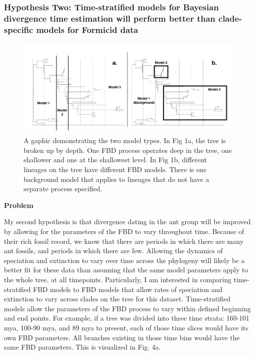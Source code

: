 \documentclass[12pt]{article}
\begin{document}
\subsubsection*{Hypothesis Two: Time-stratified models for Bayesian divergence time estimation will perform better than clade-specific models for Formicid data}
\begin{figure}
  \caption{A gaphic demonstrating the two model types. In Fig 1a, the tree is broken up by depth. One FBD process operates deep in the tree, one shallower and one at the shallowest level. In Fig 1b, different lineages on the tree have different FBD models. There is one background model that applies to lineages that do not have a separate process specified.}
  \centering
    \includegraphics[width=1\textwidth]{2ab}
\end{figure}
\textbf{Problem} \par
My second hypothesis is that divergence dating in the ant group will be improved by allowing for the parameters of the FBD to vary throughout time.
Because of their rich fossil record, we know that there are periods in which there are many ant fossils, and periods in which there are few. 
Allowing the dynamics of speciation and extinction to vary over time across the phylogeny will likely be a better fit for these data than assuming that the same model parameters apply to the whole tree, at all timepoints.
Particularly, I am interested in comparing time-stratified FBD models to FBD models that allow rates of speciation and extinction to vary across clades on the tree for this dataset. 
Time-stratified models allow the parameters of the FBD process to vary within defined beginning and end points.
For example, if a tree was divided into three time strata: 160-101 mya, 100-90 mya, and 89 mya to present, each of those time slices would have its own FBD parameters. 
All branches existing in those time bins would have the same FBD parameters.
This is visualized in Fig. 4a.\par
\end{document}
